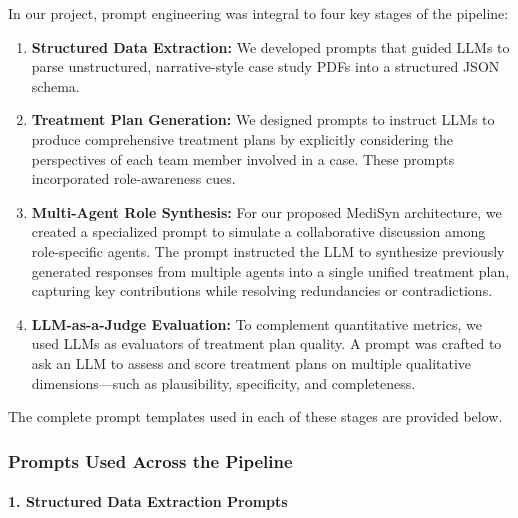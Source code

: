 \documentclass[pdflatex,sn-mathphys-num]{sn-jnl}%
\theoremstyle{thmstyleone}%
\theoremstyle{thmstyletwo}%
\theoremstyle{thmstylethree}%
\begin{document}
In our project, prompt engineering was integral to four key stages of the pipeline:

\begin{enumerate}
    \item \textbf{Structured Data Extraction:} We developed prompts that guided LLMs to parse unstructured, narrative-style case study PDFs into a structured JSON schema.

    \item \textbf{Treatment Plan Generation:} We designed prompts to instruct LLMs to produce comprehensive treatment plans by explicitly considering the perspectives of each team member involved in a case. These prompts incorporated role-awareness cues.

    \item \textbf{Multi-Agent Role Synthesis:} For our proposed MediSyn architecture, we created a specialized prompt to simulate a collaborative discussion among role-specific agents. The prompt instructed the LLM to synthesize previously generated responses from multiple agents into a single unified treatment plan, capturing key contributions while resolving redundancies or contradictions.

    \item \textbf{LLM-as-a-Judge Evaluation:} To complement quantitative metrics, we used LLMs as evaluators of treatment plan quality. A prompt was crafted to ask an LLM to assess and score treatment plans on multiple qualitative dimensions—such as plausibility, specificity, and completeness.
\end{enumerate}

The complete prompt templates used in each of these stages are provided below.

\subsubsection*{Prompts Used Across the Pipeline}

\paragraph{1. Structured Data Extraction Prompts}
\end{document}

